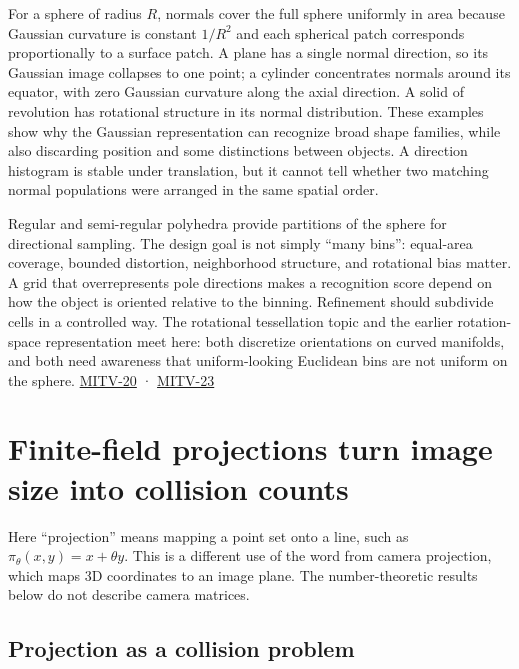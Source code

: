 For a sphere of radius \(R\), normals cover the full sphere uniformly in area because Gaussian curvature is constant \(1/R^2\) and each spherical patch corresponds proportionally to a surface patch. A plane has a single normal direction, so its Gaussian image collapses to one point; a cylinder concentrates normals around its equator, with zero Gaussian curvature along the axial direction. A solid of revolution has rotational structure in its normal distribution. These examples show why the Gaussian representation can recognize broad shape families, while also discarding position and some distinctions between objects. A direction histogram is stable under translation, but it cannot tell whether two matching normal populations were arranged in the same spatial order.

Regular and semi-regular polyhedra provide partitions of the sphere for directional sampling. The design goal is not simply ``many bins'': equal-area coverage, bounded distortion, neighborhood structure, and rotational bias matter. A grid that overrepresents pole directions makes a recognition score depend on how the object is oriented relative to the binning. Refinement should subdivide cells in a controlled way. The rotational tessellation topic and the earlier rotation-space representation meet here: both discretize orientations on curved manifolds, and both need awareness that uniform-looking Euclidean bins are not uniform on the sphere. \hyperref[04-visual-computing-ii-ch036-mitv-20---space-of-rotations-regular-tessellations-critical-surfaces-binocular-stereo]{MITV-20} · \hyperref[04-visual-computing-ii-ch036-mitv-23---gaussian-image-solids-of-revolution-direction-histograms-regular-polyhedra]{MITV-23}

\section{Finite-field projections turn image size into collision counts}\label{04-visual-computing-ii-ch032-finite-field-projections-turn-image-size-into-collision-counts}

Here ``projection'' means mapping a point set onto a line, such as \(\pi_\theta(x,y)=x+\theta y\). This is a different use of the word from camera projection, which maps 3D coordinates to an image plane. The number-theoretic results below do not describe camera matrices.

\subsection{Projection as a collision problem}\label{04-visual-computing-ii-ch032-projection-as-a-collision-problem}

